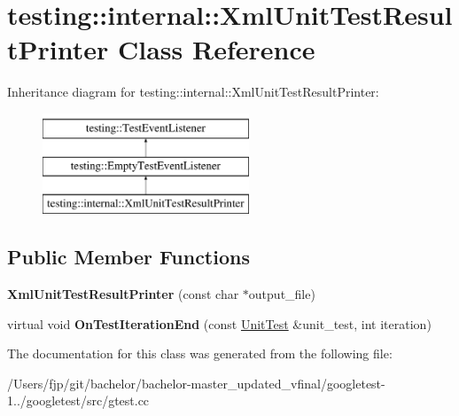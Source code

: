 \hypertarget{classtesting_1_1internal_1_1_xml_unit_test_result_printer}{}\section{testing\+:\+:internal\+:\+:Xml\+Unit\+Test\+Result\+Printer Class Reference}
\label{classtesting_1_1internal_1_1_xml_unit_test_result_printer}
Inheritance diagram for testing\+:\+:internal\+:\+:Xml\+Unit\+Test\+Result\+Printer\+:\begin{figure}[H]
\begin{center}
\leavevmode
\includegraphics[height=3.000000cm]{classtesting_1_1internal_1_1_xml_unit_test_result_printer}
\end{center}
\end{figure}
\subsection*{Public Member Functions}
\begin{DoxyCompactItemize}
\item 
\mbox{\label{classtesting_1_1internal_1_1_xml_unit_test_result_printer_afdaf88e6764c18ce0dcc3733d7a06e31}} 
{\bfseries Xml\+Unit\+Test\+Result\+Printer} (const char $\ast$output\+\_\+file)
\item 
\mbox{\label{classtesting_1_1internal_1_1_xml_unit_test_result_printer_a2ae986dd2f4f2aed31cc6f3bc8c56898}} 
virtual void {\bfseries On\+Test\+Iteration\+End} (const \mbox{\hyperlink{classtesting_1_1_unit_test}{Unit\+Test}} \&unit\+\_\+test, int iteration)
\end{DoxyCompactItemize}


The documentation for this class was generated from the following file\+:\begin{DoxyCompactItemize}
\item 
/\+Users/fjp/git/bachelor/bachelor-\/master\+\_\+updated\+\_\+vfinal/googletest-\/1../googletest/src/gtest.\+cc\end{DoxyCompactItemize}
